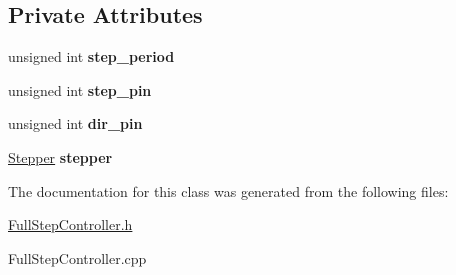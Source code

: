 \subsection*{Private Attributes}
\begin{DoxyCompactItemize}
\item 
\mbox{\label{classFullStepController_afc92f9d012da060b6b9be7a670fb9878}} 
unsigned int {\bfseries step\+\_\+period}
\item 
\mbox{\label{classFullStepController_abbf462dac01856f90aeb3ef0f2cf0b3e}} 
unsigned int {\bfseries step\+\_\+pin}
\item 
\mbox{\label{classFullStepController_ab3f15365c34738b91161a672d3abc358}} 
unsigned int {\bfseries dir\+\_\+pin}
\item 
\mbox{\label{classFullStepController_a13c27cad1a8401ca9a8c6829deb8194d}} 
\mbox{\hyperlink{classStepper}{Stepper}} {\bfseries stepper}
\end{DoxyCompactItemize}


The documentation for this class was generated from the following files\+:\begin{DoxyCompactItemize}
\item 
\mbox{\hyperlink{FullStepController_8h}{Full\+Step\+Controller.\+h}}\item 
Full\+Step\+Controller.\+cpp\end{DoxyCompactItemize}
